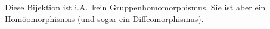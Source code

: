 \begin{warning}
  Diese Bijektion ist i.A.\ kein Gruppenhomomorphismus.
  Sie ist aber ein Homöomorphismus (und sogar ein Diffeomorphismus).
\end{warning}




